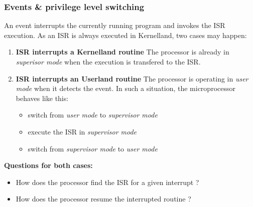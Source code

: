 %
%
%

\begin{frame}
  \frametitle{Events \& privilege level switching}

  An event interrupts the currently running program and invokes the ISR
  execution. As an ISR is always executed in Kernelland, two cases may happen:

  \begin{enumerate}
    \item {\bf ISR interrupts a Kernelland routine}
    The processor is already in {\em superisor mode} when the execution is
    transfered to the ISR.

    \item {\bf ISR interrupts an Userland routine}
    The processor is operating in {\em user mode} when it detects the event.
    In such a situation, the microprocessor behaves like this:

    \begin{itemize}
      \item switch from {\em user mode} to {\em supervisor mode}
      \item execute the ISR in {\em supervisor mode}
      \item switch from {\em supervisor mode} to {\em user mode}
    \end{itemize}

  \end{enumerate}

  \nl

  {\bf Questions for both cases:}

  \begin{itemize}
    \item How does the processor find the ISR for a given interrupt ?
    \item How does the processor resume the interrupted routine ?
  \end{itemize}

\end{frame}

%
%
%

